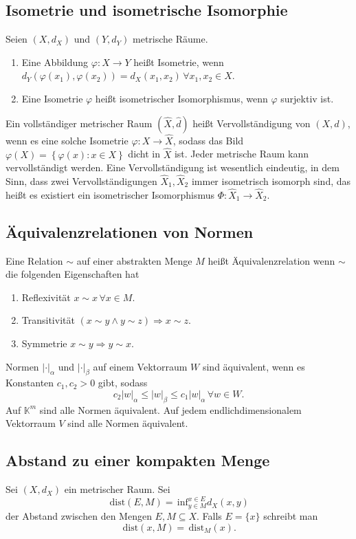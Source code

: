 \documentclass[a4paper,12pt]{article}
\begin{document}
\subsection{Isometrie und isometrische Isomorphie}
Seien $(X,d_X)$ und $(Y,d_Y)$ metrische Räume.
\begin{enumerate}[label=\arabic*.]
        \item Eine Abbildung $\varphi :X\rightarrow Y$ heißt Isometrie, wenn $d_Y(\varphi (x_1),\varphi (x_2))=d_X(x_1,x_2)\,\forall x_1,x_2 \in X$.
        \item Eine Isometrie $\varphi $ heißt isometrischer Isomorphismus, wenn $\varphi $ surjektiv ist.
\end{enumerate}
Ein vollständiger metrischer Raum $(\hat{X},\hat{d})$ heißt Vervollständigung von $(X,d)$, wenn es eine solche Isometrie $\varphi :X\rightarrow \hat{X}$, sodass das Bild $\varphi (X)=\left\{\varphi (x):x \in X\right\}$ dicht in $\hat{X}$ ist. Jeder metrische Raum kann vervollständigt werden. Eine Vervollständigung ist wesentlich eindeutig, in dem Sinn, dass zwei Vervollständigungen $\hat{X}_1,\hat{X}_2$ immer isometrisch isomorph sind, das heißt es existiert ein isometrischer Isomorphismus $\Phi:\hat{X}_1\rightarrow \hat{X}_2$.

\subsection{Äquivalenzrelationen von Normen}
Eine Relation $\sim$ auf einer abstrakten Menge $M$ heißt Äquivalenzrelation wenn $\sim$ die folgenden Eigenschaften hat
\begin{enumerate}[label=\arabic*.]
        \item Reflexivität $x\sim x\,\forall x \in M$.
        \item Transitivität $(x\sim y\land y\sim z)\Rightarrow x\sim z$.
        \item Symmetrie $x\sim y\Rightarrow y\sim x$.
\end{enumerate}
Normen $|\cdot |_\alpha $ und $|\cdot |_\beta $ auf einem Vektorraum $W$ sind äquivalent, wenn es Konstanten $c_1,c_2>0$ gibt, sodass 
\[
        c_2|w|_\alpha \leq |w|_\beta \leq c_1|w|_\alpha \,\forall w \in W
.\]
Auf $\mathbb{K}^m$ sind alle Normen äquivalent. Auf jedem endlichdimensionalem Vektorraum $V$ sind alle Normen äquivalent.

\subsection{Abstand zu einer kompakten Menge}
Sei $(X,d_X)$ ein metrischer Raum. Sei
\[ 
        \,\text{dist}(E,M)=\,\text{inf}_{y \in M}^{x \in E}d_X(x,y)
\] 
der Abstand zwischen den Mengen $E,M\subseteq X$. Falls $E=\{x\}$ schreibt man
\[ 
        \,\text{dist}(x,M)=\,\text{dist}_M(x)
.\] 
\end{document}
